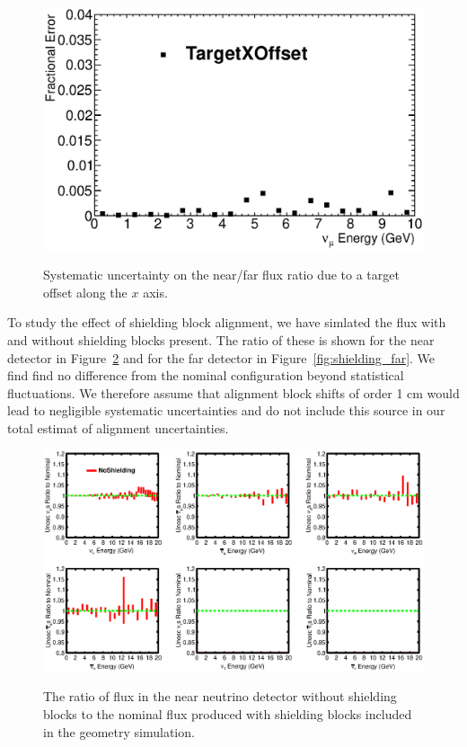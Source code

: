 \begin{figure}[ht]
\label{fig:TargetXOffset_nof_error}
  \begin{center}
    {\includegraphics[width=6.0in]{figures/TargetXOffset_nof_error.eps}}
  \end{center}
\caption{ Systematic uncertainty on the near/far flux ratio due to a target offset along the $x$ axis. }
\end{figure}

To study the effect of shielding block alignment, we have simlated the flux with and without shielding blocks present.  The ratio of these is shown for the near detector in Figure~\ref{fig:shielding_near} and for the far detector in Figure~\ref{fig:shielding_far}. We find find no difference from the nominal configuration beyond statistical fluctuations.  We therefore assume that alignment block shifts of order 1 cm would lead to negligible systematic uncertainties and do not include this source in our total estimat of alignment uncertainties.

\begin{figure}[ht]
\label{fig:shielding_near}
  \begin{center}
    {\includegraphics[width=6.0in]{figures/comp_flux_ratios_FHC_unoscillated_Nominal_NoShielding_near.eps}}
  \end{center}
\caption{ The ratio of flux in the near neutrino detector without shielding blocks to the nominal flux produced with shielding blocks included in the geometry simulation. }
\end{figure}

